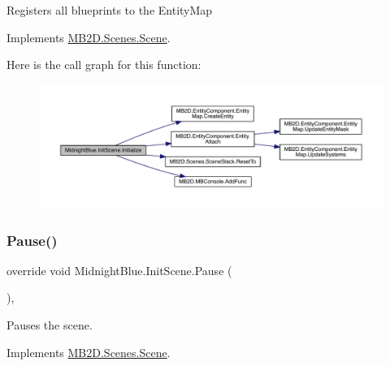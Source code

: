 Registers all blueprints to the Entity\+Map 



Implements \hyperlink{class_m_b2_d_1_1_scenes_1_1_scene_a081b4f8866936b495bdce388a7c96c25}{M\+B2\+D.\+Scenes.\+Scene}.

Here is the call graph for this function\+:\nopagebreak
\begin{figure}[H]
\begin{center}
\leavevmode
\includegraphics[width=350pt]{class_midnight_blue_1_1_init_scene_a99eee8cc5dab8d7263591aeaa50144fb_cgraph}
\end{center}
\end{figure}
\hypertarget{class_midnight_blue_1_1_init_scene_adbcab013e715e5c49ad09bcd0545d994}{}\label{class_midnight_blue_1_1_init_scene_adbcab013e715e5c49ad09bcd0545d994} 
\subsubsection{\texorpdfstring{Pause()}{Pause()}}
{\footnotesize\ttfamily override void Midnight\+Blue.\+Init\+Scene.\+Pause (\begin{DoxyParamCaption}{ }\end{DoxyParamCaption})\hspace{0.3cm}{\ttfamily [inline]}, {\ttfamily [virtual]}}



Pauses the scene. 



Implements \hyperlink{class_m_b2_d_1_1_scenes_1_1_scene_a0661eff0223150fa8e9ea88145409e5d}{M\+B2\+D.\+Scenes.\+Scene}.

\hypertarget{class_midnight_blue_1_1_init_scene_a01ade76252a492d20181bd2e00eb217f}{}\label{class_midnight_blue_1_1_init_scene_a01ade76252a492d20181bd2e00eb217f} 
